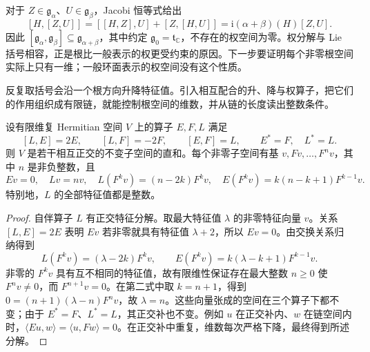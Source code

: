 对于 \(Z\in\mathfrak g_\alpha\)、\(U\in\mathfrak g_\beta\)，Jacobi 恒等式给出
\[
	[H,[Z,U]]=[[H,Z],U]+[Z,[H,U]]
	=\mathrm{i}(\alpha+\beta)(H)[Z,U].
\]
因此 \([\mathfrak g_\alpha,\mathfrak g_\beta]\subseteq\mathfrak g_{\alpha+\beta}\)，其中约定 \(\mathfrak g_0=\mathfrak t_{\mathbb C}\)，不存在的权空间为零。权分解与 Lie 括号相容，正是根比一般表示的权更受约束的原因。下一步要证明每个非零根空间实际上只有一维；一般环面表示的权空间没有这个性质。

\ProseParagraphBreak
反复取括号会沿一个根方向升降特征值。引入相互配合的升、降与权算子，把它们的作用组织成有限链，就能控制根空间的维数，并从链的长度读出整数条件。

\begin{lemma}\label{g1:lem:sl2-weight-chain}
	设有限维复 Hermitian 空间 \(V\) 上的算子 \(E,F,L\) 满足
	\[
		[L,E]=2E,\qquad [L,F]=-2F,\qquad [E,F]=L,
		\qquad E^*=F,\quad L^*=L.
	\]
	则 \(V\) 是若干相互正交的不变子空间的直和。每个非零子空间有基
	\(v,Fv,\ldots,F^nv\)，其中 \(n\) 是非负整数，且
	\[
		Ev=0,\quad Lv=nv,\quad
		L(F^kv)=(n-2k)F^kv,\quad
		E(F^kv)=k(n-k+1)F^{k-1}v.
	\]
	特别地，\(L\) 的全部特征值都是整数。
\end{lemma}
\begin{proof}
	自伴算子 \(L\) 有正交特征分解。取最大特征值 \(\lambda\) 的非零特征向量 \(v\)。关系 \([L,E]=2E\) 表明 \(Ev\) 若非零就具有特征值 \(\lambda+2\)，所以 \(Ev=0\)。由交换关系归纳得到
	\[
		L(F^kv)=(\lambda-2k)F^kv,\qquad
		E(F^kv)=k(\lambda-k+1)F^{k-1}v.
	\]
	非零的 \(F^kv\) 具有互不相同的特征值，故有限维性保证存在最大整数 \(n\ge0\) 使 \(F^nv\ne0\)，而 \(F^{n+1}v=0\)。在第二式中取 \(k=n+1\)，得到
	\(0=(n+1)(\lambda-n)F^nv\)，故 \(\lambda=n\)。这些向量张成的空间在三个算子下都不变；由于 \(E^*=F\)、\(L^*=L\)，其正交补也不变。例如 \(u\) 在正交补内、\(w\) 在链空间内时，\(\langle Eu,w\rangle=\langle u,Fw\rangle=0\)。在正交补中重复，维数每次严格下降，最终得到所述分解。
\end{proof}

